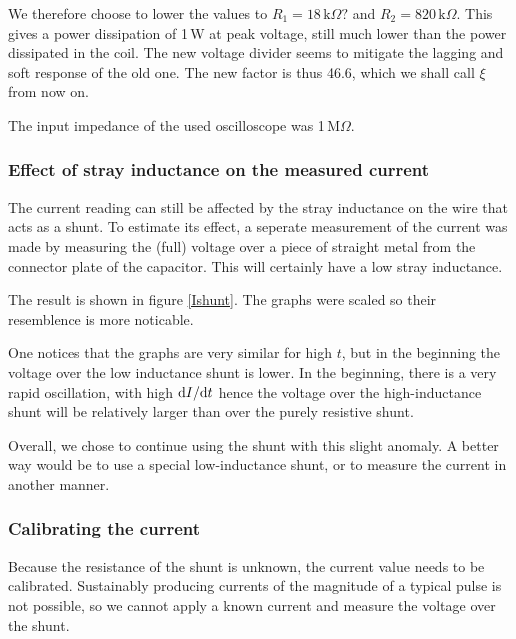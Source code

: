 
We therefore choose to lower the values to $R_1 = 18\,\mathrm{k}\Omega?$ 
and $R_2 = 820\,\mathrm{k}\Omega$. This gives a power dissipation of 1\,W 
at peak voltage, still much lower than the power dissipated in the coil.  
The new voltage divider seems to mitigate the lagging and soft response of 
the old one. The new factor is thus 46.6, which we shall call $\xi$ from 
now on.






The input impedance of the used oscilloscope was 1\,M$\Omega$.



\subsubsection{Effect of stray inductance on the measured current}
The current reading can still be affected by the stray inductance on the 
wire that acts as a shunt. To estimate its effect, a seperate measurement 
of the current was made by measuring the (full) voltage over a piece of 
straight metal from the connector plate of the capacitor. This will 
certainly have a low stray inductance.

The result is shown in figure \ref{Ishunt}. The graphs were scaled so their 
resemblence is more noticable.


One notices that the graphs are very similar for high $t$, but in the 
beginning the voltage over the low inductance shunt is lower. In the 
beginning, there is a very rapid oscillation, with high $\mathrm d I / \mathrm d t$ 
hence the voltage over the high-inductance shunt will be relatively larger 
than over the purely resistive shunt.

Overall, we chose to continue using the shunt with this slight anomaly. A 
better way would be to use a special low-inductance shunt, or to measure 
the current in another manner.

\subsubsection{Calibrating the current}
Because the resistance of the shunt is unknown, the current value needs to 
be calibrated. Sustainably producing currents of the magnitude of a typical 
pulse is not possible, so we cannot apply a known current and measure the 
voltage over the shunt.

